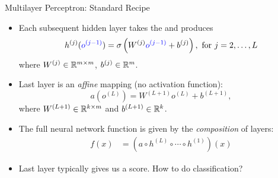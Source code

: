 \documentclass[usenames,dvipsnames,notes,11pt,aspectratio=169]{beamer}
\begin{document}
\begin{frame}{Multilayer Perceptron: Standard Recipe}
\begin{itemize}[<+->]
\item Each subsequent hidden layer takes the  and produces
\[
h^{(j)}({\color{blue}o^{(j-1)}})=\sigma\left(W^{(j)}{\color{blue}o^{(j-1)}}+b^{(j)}\right),\text{ for }j=2,\ldots,L
\]
where $W^{(j)}\in\mathbb{R}^{m\times m}$, $b^{(j)}\in\mathbb{R}^{m}$.

\item Last layer is an \emph{affine} mapping (no activation function): 
\[
a(o^{(L)})=W^{(L+1)}o^{(L)}+b^{(L+1)},
\]
where $W^{(L+1)}\in\mathbb{R}^{k\times m}$ and $b^{(L+1)}\in\mathbb{R}^{k}$.

\item The full neural network function is given by the \emph{composition} of
layers:
\begin{align}
f(x) &= \left(a\circ h^{(L)}\circ\cdots\circ h^{(1)}\right)(x)
\end{align}

\item Last layer typically gives us a score. How to do classification?
\end{itemize}
\end{frame}
\end{document}
